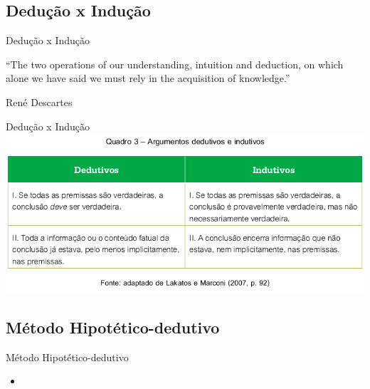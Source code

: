 \documentclass{beamer}
\begin{document}


\subsection{Dedução x Indução}

\begin{frame}{Dedução x Indução}
  \begin{block}{}
    ``The two operations of our understanding, intuition and deduction,
    on which alone we have said we must rely in the acquisition of
    knowledge.''

    René Descartes
  \end{block}
\end{frame}

\begin{frame}{Dedução x Indução}
\includegraphics[width=\textwidth]{deducao_vs_inducao}
\end{frame}

\subsection{Método Hipotético-dedutivo}

\begin{frame}{Método Hipotético-dedutivo}
  \begin{itemize}
  \item 
  \end{itemize}
\end{frame}
\end{document}
